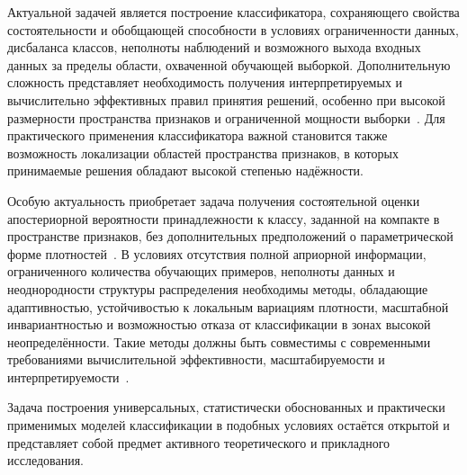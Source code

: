 Актуальной задачей является построение классификатора, сохраняющего свойства состоятельности и обобщающей способности в условиях ограниченности данных, дисбаланса классов, неполноты наблюдений и возможного выхода входных данных за пределы области, охваченной обучающей выборкой. Дополнительную сложность представляет необходимость получения интерпретируемых и вычислительно эффективных правил принятия решений, особенно при высокой размерности пространства признаков и ограниченной мощности выборки~\cite{rudin2019stop}. Для практического применения классификатора важной становится также возможность локализации областей пространства признаков, в которых принимаемые решения обладают высокой степенью надёжности.

Особую актуальность приобретает задача получения состоятельной оценки апостериорной вероятности принадлежности к классу, заданной на компакте в пространстве признаков, без дополнительных предположений о параметрической форме плотностей~\cite{devroye2013probabilistic}. В условиях отсутствия полной априорной информации, ограниченного количества обучающих примеров, неполноты данных и неоднородности структуры распределения необходимы методы, обладающие адаптивностью, устойчивостью к локальным вариациям плотности, масштабной инвариантностью и возможностью отказа от классификации в зонах высокой неопределённости. Такие методы должны быть совместимы с современными требованиями вычислительной эффективности, масштабируемости и интерпретируемости~\cite{dwivedi2023explainable}.

Задача построения универсальных, статистически обоснованных и практически применимых моделей классификации в подобных условиях остаётся открытой и представляет собой предмет активного теоретического и прикладного исследования.




